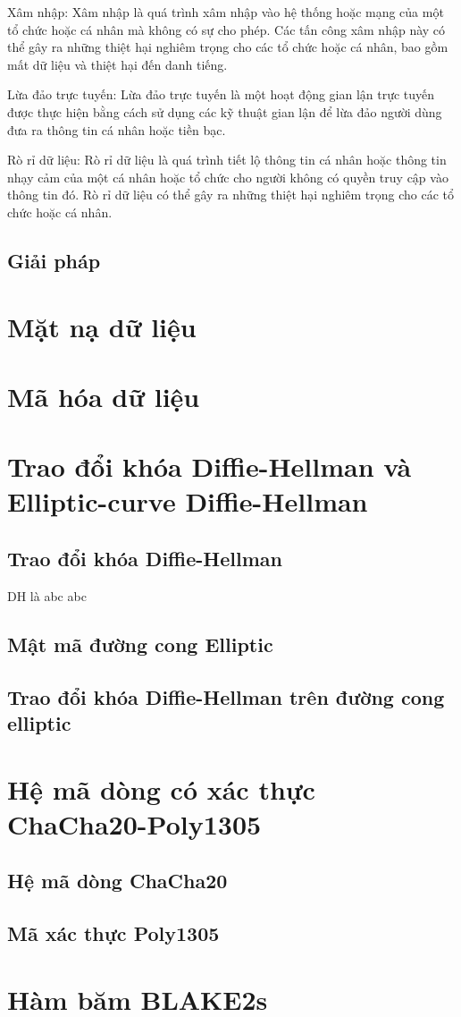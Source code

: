 Xâm nhập: Xâm nhập là quá trình xâm nhập vào hệ thống hoặc mạng của một tổ chức hoặc cá nhân mà không có sự cho phép. Các tấn công xâm nhập này có thể gây ra những thiệt hại nghiêm trọng cho các tổ chức hoặc cá nhân, bao gồm mất dữ liệu và thiệt hại đến danh tiếng. 

Lừa đảo trực tuyến: Lừa đảo trực tuyến là một hoạt động gian lận trực tuyến được thực hiện bằng cách sử dụng các kỹ thuật gian lận để lừa đảo người dùng đưa ra thông tin cá nhân hoặc tiền bạc. 

Rò rỉ dữ liệu: Rò rỉ dữ liệu là quá trình tiết lộ thông tin cá nhân hoặc thông tin nhạy cảm của một cá nhân hoặc tổ chức cho người không có quyền truy cập vào thông tin đó. Rò rỉ dữ liệu có thể gây ra những thiệt hại nghiêm trọng cho các tổ chức hoặc cá nhân.
\subsection{Giải pháp}
\section{Mặt nạ dữ liệu}
\section{Mã hóa dữ liệu}
\section{Trao đổi khóa Diffie-Hellman và Elliptic-curve Diffie-Hellman}
\subsection{Trao đổi khóa Diffie-Hellman}

\ac{DH} là abc abc

\subsection{Mật mã đường cong Elliptic}
\subsection{Trao đổi khóa Diffie-Hellman trên đường cong elliptic}
\section{Hệ mã dòng có xác thực ChaCha20-Poly1305}
\subsection{Hệ mã dòng ChaCha20}
\subsection{Mã xác thực Poly1305}
\section{Hàm băm BLAKE2s}